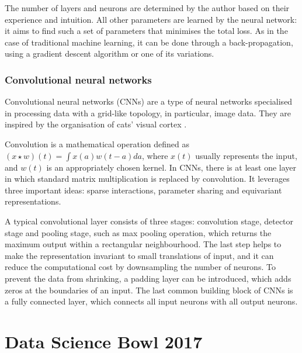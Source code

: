 \documentclass[12pt]{article}
\begin{document}
The number of layers and neurons are determined by the author based on their experience and intuition. All other parameters are learned by the neural network: it aims to find such a set of parameters that minimises the total loss. As in the case of traditional machine learning, it can be done through a back-propagation, using a gradient descent algorithm or one of its variations.

\subsubsection{Convolutional neural networks}
Convolutional neural networks (CNNs) are a type of neural networks specialised in processing data with a grid-like topology, in particular, image data. They are inspired by the organisation of cats' visual cortex \citep{miotto2017deep}.

Convolution is a mathematical operation defined as $(x \star w)(t)= \int x(a)w(t-a)da $, where $x(t)$ usually represents the input, and $w(t)$ is an appropriately chosen kernel. In CNNs, there is at least one layer in which standard matrix multiplication is replaced by convolution. It leverages three important ideas: sparse interactions, parameter sharing and equivariant representations. 

A typical convolutional layer consists of three stages: convolution stage,  detector stage and pooling stage, such as max pooling operation, which returns the maximum output within a rectangular neighbourhood. The last step helps to make the representation invariant to small translations of input, and it can reduce the computational cost by downsampling the number of neurons. To prevent the data from shrinking, a padding layer can be introduced, which adds zeros at the boundaries of an input. The last common building block of CNNs is a fully connected layer, which connects all input neurons with all output neurons. 


\section{Data Science Bowl 2017}
\end{document}
